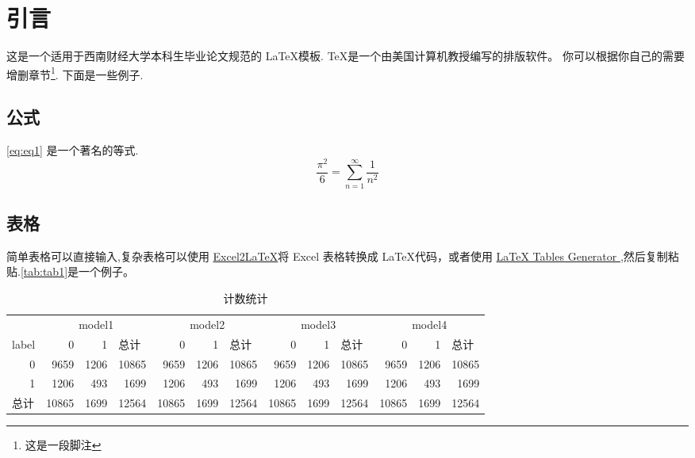 \section{引言}
这是一个适用于西南财经大学本科生毕业论文规范的 \LaTeX \cite{lamport1994latex,goossens1994latex}模板.
\TeX 是一个由美国计算机教授\citet{knuth1984texbook}编写的排版软件。
你可以根据你自己的需要增删章节\footnote{这是一段脚注}. 下面是一些例子.

\subsection{公式}
\autoref{eq:eq1} 是一个著名的等式.
\begin{equation}\label{eq:eq1}
    \frac{\pi^2}{6}=\sum_{n=1}^{\infty}\frac{1}{n^2}
\end{equation}
\subsection{表格}
简单表格可以直接输入,复杂表格可以使用 \href{https://github.com/krlmlr/Excel2LaTeX}{Excel2LaTeX}将 Excel 表格转换成 \LaTeX 代码，或者使用 \href{https://www.tablesgenerator.com/latex_tables}{LaTeX Tables Generator
},然后复制粘贴.\autoref{tab:tab1}是一个例子。 
\begin{table}[htbp]
    \centering
    \caption{计数统计}
      \begin{tabular}{|l|rrr|rrr|rrr|rrr|}
      \hline
        & \multicolumn{3}{c|}{model1} & \multicolumn{3}{c|}{model2} & \multicolumn{3}{c|}{model3} & \multicolumn{3}{c|}{model4} \bigstrut\\
  \cline{2-13}    label & 0 & 1 & \multicolumn{1}{l|}{总计} & 0 & 1 & \multicolumn{1}{l|}{总计} & 0 & 1 & \multicolumn{1}{l|}{总计} & 0 & 1 & \multicolumn{1}{l|}{总计} \bigstrut\\
      \hline
      \multicolumn{1}{|r|}{0} & 9659 & 1206 & 10865 & 9659 & 1206 & 10865 & 9659 & 1206 & 10865 & 9659 & 1206 & 10865 \bigstrut[t]\\
      \multicolumn{1}{|r|}{1} & 1206 & 493 & 1699 & 1206 & 493 & 1699 & 1206 & 493 & 1699 & 1206 & 493 & 1699 \\
      总计 & 10865 & 1699 & 12564 & 10865 & 1699 & 12564 & 10865 & 1699 & 12564 & 10865 & 1699 & 12564 \bigstrut[b]\\
      \hline
      \end{tabular}%
    \label{tab:tab1}%
  \end{table}%
  
